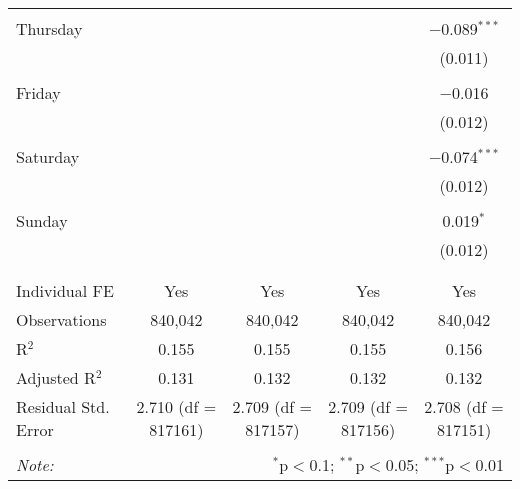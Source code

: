 \documentclass[
]{article}
\begin{document}
\begin{table}[!htbp]
{\begin{tabular}{@{\extracolsep{5pt}}lcccc}
  & & & & \\ 
 Thursday &  &  &  & $-$0.089$^{***}$ \\ 
  &  &  &  & (0.011) \\ 
  & & & & \\ 
 Friday &  &  &  & $-$0.016 \\ 
  &  &  &  & (0.012) \\ 
  & & & & \\ 
 Saturday &  &  &  & $-$0.074$^{***}$ \\ 
  &  &  &  & (0.012) \\ 
  & & & & \\ 
 Sunday &  &  &  & 0.019$^{*}$ \\ 
  &  &  &  & (0.012) \\ 
  & & & & \\ 
\hline \\[-1.8ex] 
Individual FE & Yes & Yes & Yes & Yes \\ 
Observations & 840,042 & 840,042 & 840,042 & 840,042 \\ 
R$^{2}$ & 0.155 & 0.155 & 0.155 & 0.156 \\ 
Adjusted R$^{2}$ & 0.131 & 0.132 & 0.132 & 0.132 \\ 
Residual Std. Error & 2.710 (df = 817161) & 2.709 (df = 817157) & 2.709 (df = 817156) & 2.708 (df = 817151) \\ 
\hline 
\hline \\[-1.8ex] 
\textit{Note:}  & \multicolumn{4}{r}{$^{*}$p$<$0.1; $^{**}$p$<$0.05; $^{***}$p$<$0.01} \\ 
\end{tabular}
} 
\end{table} 
\newpage
\end{document}
